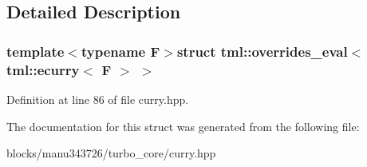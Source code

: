 \subsection{Detailed Description}
\subsubsection*{template$<$typename F$>$struct tml\+::overrides\+\_\+eval$<$ tml\+::ecurry$<$ F $>$ $>$}



Definition at line 86 of file curry.\+hpp.



The documentation for this struct was generated from the following file\+:\begin{DoxyCompactItemize}
\item 
blocks/manu343726/turbo\+\_\+core/curry.\+hpp\end{DoxyCompactItemize}
